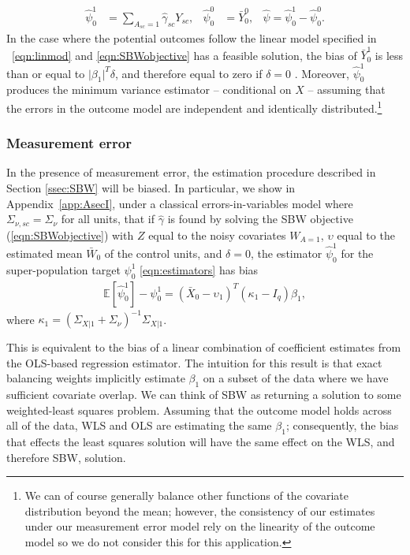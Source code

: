 \documentclass[aoas]{imsart}
\theoremstyle{plain}
\theoremstyle{remark}
\begin{document}
\begin{align}\label{eqn:estimators}
\hat{\psi}_0^1 &= \sum_{A_{sc}=1} \hat{\gamma}_{sc} Y_{sc}, & \hat{\psi}_0^0 & = \bar{Y}_0^0, & \hat{\psi} = \hat{\psi}_0^1 - \hat{\psi}_0^0.
\end{align}
%
In the case where the potential outcomes follow the linear model specified in ~\eqref{eqn:linmod} and \eqref{eqn:SBWobjective} has a feasible solution, the bias of $\bar{Y}^1_0$ is less than or equal to $\lvert\beta_1\rvert^T\delta$, and therefore equal to zero if $\delta = 0$ \citep{zubizarreta2015stable}. Moreover, $\hat{\psi}_0^1$ produces the minimum variance estimator -- conditional on $X$ -- assuming that the errors in the outcome model are independent and identically distributed.\footnote{We can of course generally balance other functions of the covariate distribution beyond the mean; however, the consistency of our estimates under our measurement error model rely on the linearity of the outcome model so we do not consider this for this application.}

\subsubsection{Measurement error}\label{ssec:methodsmsrment} 

In the presence of measurement error, the estimation procedure described in Section \ref{ssec:SBW} will be biased. In particular, we show in Appendix~\ref{app:AsecI}, under a classical errors-in-variables model where $\Sigma_{\nu,sc} = \Sigma_{\nu}$ for all units, that if $\hat{\gamma}$ is found by solving the SBW objective (\ref{eqn:SBWobjective}) with $Z$ equal to the noisy covariates $W_{A=1}$, $\upsilon$ equal to the estimated mean $\bar{W}_0$ of the control units, and $\delta=0$, the estimator $\hat{\psi}_0^1$ for the super-population target $\psi_0^1$ \eqref{eqn:estimators} has bias
\begin{align*}
\mathbb{E}[\hat{\psi}_0^1] - \psi_0^1 = (\bar{X}_0 - \upsilon_1)^T(\kappa_1 - I_q)\beta_1,  
\end{align*}
where $\kappa_1 = (\Sigma_{X|1} + \Sigma_{\nu})^{-1}\Sigma_{X|1}$.
%

This is equivalent to the bias of a linear combination of coefficient estimates from the OLS-based regression estimator. The intuition for this result is that exact balancing weights implicitly estimate $\beta_1$ on a subset of the data where we have sufficient covariate overlap. We can think of SBW as returning a solution to some weighted-least squares problem. Assuming that the outcome model holds across all of the data, WLS and OLS are estimating the same $\beta_1$; consequently, the bias that effects the least squares solution will have the same effect on the WLS, and therefore SBW, solution. 
\end{document}
